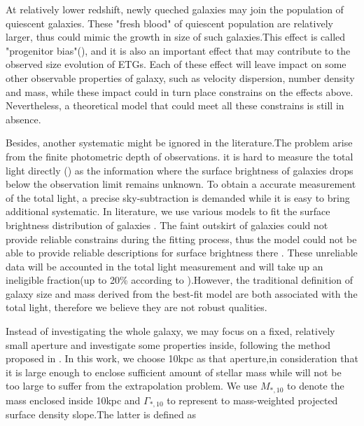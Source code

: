 \documentclass[fleqn,usenatbib]{mnras}
\begin{document}
\par At relatively lower redshift, newly queched galaxies may join the population of quiescent galaxies. These "fresh blood" of quiescent population are relatively larger, thus could mimic the growth in size of such galaxies.This effect is called "progenitor bias"(\cite{van_dokkum_1996,carolloNEWLYQUENCHEDGALAXIES2013, fagioliMinorMergersProgenitor2016, vandokkumMorphologicalEvolutionAges2001}), and it is also an important effect that may contribute to the observed size evolution of ETGs. Each of these effect will leave impact on some other observable properties of galaxy, such as velocity dispersion, number density and mass, while these impact could in turn place constrains on the effects above. Nevertheless, a theoretical model that could meet all these constrains is still in absence.   
\par Besides, another systematic might be ignored in the literature.The problem arise from the finite photometric depth of observations. it is hard to measure the total light directly (\cite{tal_2011_faint}) as the information where the surface brightness of galaxies drops below the observation limit remains unknown. To obtain a accurate measurement of the total light, a precise sky-subtraction is demanded while it is easy to bring additional systematic. In literature, we use various models to fit the surface brightness distribution of galaxies . The faint outskirt of galaxies could not provide reliable constrains during the fitting process, thus the model could not be able to provide reliable descriptions for surface brightness there . These unreliable data will be accounted in the total light measurement and will take up an ineligible fraction(up to 20\% according to \cite{Alessandro20}).However, the traditional definition of galaxy size and mass derived from the best-fit model are both associated with the total light, therefore we believe they are not robust qualities. 
\par Instead of investigating the whole galaxy, we may focus on a fixed, relatively small aperture and investigate some properties inside, following the method proposed in \cite{Alessandro20}. In this work, we choose 10kpc as that aperture,in consideration that it is large enough to enclose sufficient amount of stellar mass while will not be too large to suffer from the extrapolation problem. We use $M_{*,10}$ to denote the mass enclosed inside 10kpc and $\Gamma_{*,10}$ to represent to mass-weighted projected surface density slope.The latter is defined as
\end{document}
